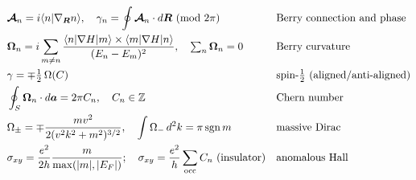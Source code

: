 \begin{fact}
\begin{align*}
    &\bm{\mathcal{A}}_n = i\langle n|\nabla_{\bm{R}}n\rangle,\quad \gamma_n = \oint\bm{\mathcal{A}}_n\cdot d\bm{R}\ (\text{mod }2\pi) && \text{Berry connection and phase}\\
    &\bm{\Omega}_n = i\sum_{m\neq n}\frac{\langle n|\nabla H|m\rangle\times\langle m|\nabla H|n\rangle}{(E_n-E_m)^2},\quad \textstyle\sum_n\bm{\Omega}_n = 0 && \text{Berry curvature}\\
    &\gamma = \mp\tfrac12\,\Omega(C) && \text{spin-}\tfrac12\text{ (aligned/anti-aligned)}\\
    &\oint_S\bm{\Omega}_n\cdot d\bm{a} = 2\pi C_n,\quad C_n\in\mathbb{Z} && \text{Chern number}\\
    &\Omega_\pm = \mp\frac{mv^2}{2(v^2k^2+m^2)^{3/2}},\quad \int\Omega_-\,d^2k = \pi\operatorname{sgn}m && \text{massive Dirac}\\
    &\sigma_{xy} = \frac{e^2}{2h}\frac{m}{\max(|m|,|E_F|)};\quad \sigma_{xy} = \frac{e^2}{h}\sum_{\text{occ}}C_n\ (\text{insulator}) && \text{anomalous Hall}
\end{align*}
\end{fact}
